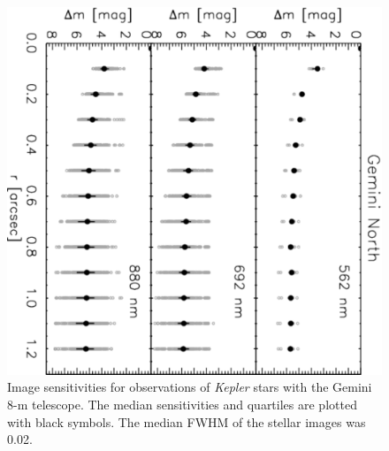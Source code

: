 \documentclass[twocolumn,appendixfloats]{aastex6}
\begin{document}
\begin{figure}[!]
\centering
\includegraphics[angle=90, scale=0.47]{GeminiN_speckle_images_sensitivities.pdf}
\caption{Image sensitivities for observations of {\it Kepler} stars with the Gemini 8-m 
telescope. The median sensitivities and quartiles are plotted with black symbols.
The median FWHM of the stellar images was 0.02\arcsec.
\label{Sensitivites_Gemini}}
\end{figure}
\end{document}
